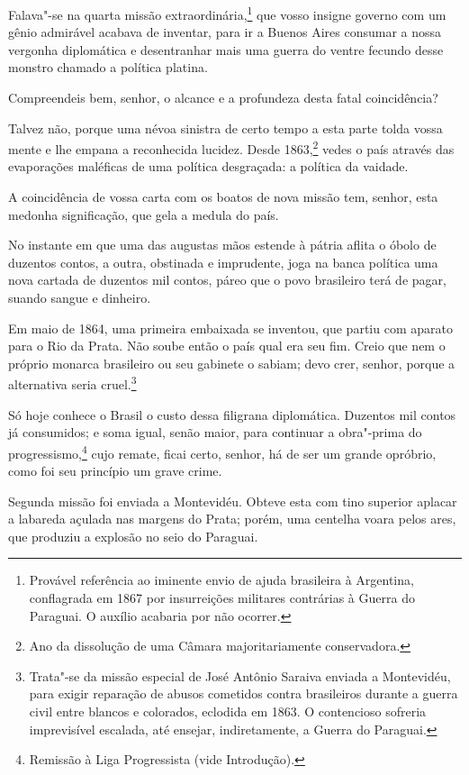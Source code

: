  Falava"-se na quarta missão
extraordinária,\footnote{ Provável referência ao iminente envio de ajuda brasileira à Argentina,
conflagrada em 1867 por insurreições militares contrárias à Guerra do
Paraguai. O auxílio acabaria por não ocorrer.}
 que vosso insigne governo com um gênio admirável acabava de inventar,
para ir a Buenos Aires consumar a nossa vergonha diplomática e
desentranhar mais uma guerra do ventre fecundo desse monstro chamado a política platina. 

 Compreendeis bem, senhor, o alcance e a profundeza desta fatal coincidência? 

 Talvez não, porque uma névoa sinistra de certo tempo a esta parte tolda
vossa mente e lhe empana a reconhecida lucidez. Desde
1863,\footnote{ Ano da dissolução de uma Câmara majoritariamente conservadora.}
 vedes o país através das evaporações maléficas de uma política
desgraçada: a política da vaidade.

 A coincidência de vossa carta com os boatos de nova missão tem, senhor,
esta medonha significação, que gela a medula do país.

 No instante em que uma das augustas mãos estende à pátria aflita o
óbolo de duzentos contos, a outra, obstinada e imprudente, joga na
banca política uma nova cartada de duzentos mil contos, páreo que o
povo brasileiro terá de pagar, suando sangue e dinheiro. 

 Em maio de 1864, uma primeira embaixada se inventou, que partiu com
aparato para o Rio da Prata. Não soube então o país qual era seu fim.
Creio que nem o próprio monarca brasileiro ou seu gabinete o sabiam;
devo crer, senhor, porque a alternativa seria
cruel.\footnote{ Trata"-se da missão especial de José Antônio Saraiva enviada a Montevidéu, 
para exigir reparação de abusos cometidos contra brasileiros durante a guerra civil 
entre blancos e colorados, eclodida em 1863. O contencioso sofreria imprevisível 
escalada, até ensejar, indiretamente, a Guerra do Paraguai.}

 Só hoje conhece o Brasil o custo dessa filigrana diplomática. Duzentos
mil contos já consumidos; e soma igual, senão maior, para continuar a
obra"-prima do progressismo,\footnote{ Remissão à Liga Progressista (vide Introdução).}
 cujo remate, ficai certo, senhor, há de ser um grande opróbrio, como
foi seu princípio um grave crime.

 Segunda missão foi enviada a Montevidéu. Obteve esta com tino superior
aplacar a labareda açulada nas margens do Prata; porém, uma centelha
voara pelos ares, que produziu a explosão no seio do Paraguai. 

